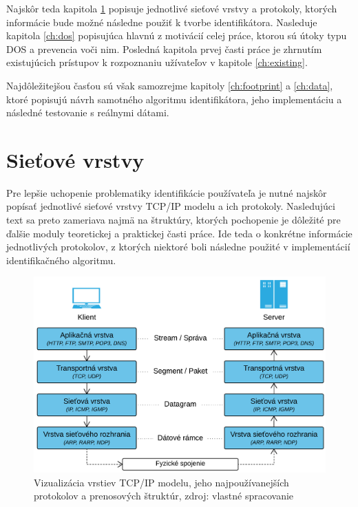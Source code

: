 \documentclass[
  digital, %
  table,   %
  lof,     %
  nolot,   %
  nocover
]{fithesis3}
\begin{document}
Najskôr teda kapitola
\ref{ch:net-layers} popisuje jednotlivé sieťové vrstvy a protokoly, ktorých
informácie bude možné následne použiť k tvorbe identifikátora. 
Nasleduje kapitola \ref{ch:dos} popisujúca hlavnú z motivácií 
celej práce, ktorou sú útoky typu DOS a prevencia voči nim.
Posledná kapitola prvej časti práce je zhrnutím
existujúcich prístupov k rozpoznaniu užívateľov v kapitole \ref{ch:existing}.

Najdôležitejšou časťou sú však
samozrejme kapitoly \ref{ch:footprint} a \ref{ch:data}, ktoré popisujú návrh samotného 
algoritmu identifikátora, jeho implementáciu a následné testovanie s reálnymi dátami.

\chapter{Sieťové vrstvy}
\label{ch:net-layers}
Pre lepšie uchopenie problematiky identifikácie používateľa je nutné najskôr
popísať jednotlivé sieťové vrstvy TCP/IP modelu a
ich protokoly. Nasledujúci text sa preto zameriava najmä na štruktúry, ktorých pochopenie je
dôležité pre ďalšie moduly teoretickej a praktickej časti práce. Ide teda o
konkrétne informácie jednotlivých protokolov, z ktorých niektoré boli následne použité v implementácií
identifikačného algoritmu.

\begin{figure}[h]
  \centering
    \includegraphics[width=\textwidth]{images/net-layers.png}
  \caption{Vizualizácia vrstiev TCP/IP modelu, jeho najpoužívanejších protokolov
  a prenosových štruktúr, zdroj: vlastné spracovanie}
  \label{fig:net-layers}
\end{figure}
\end{document}

